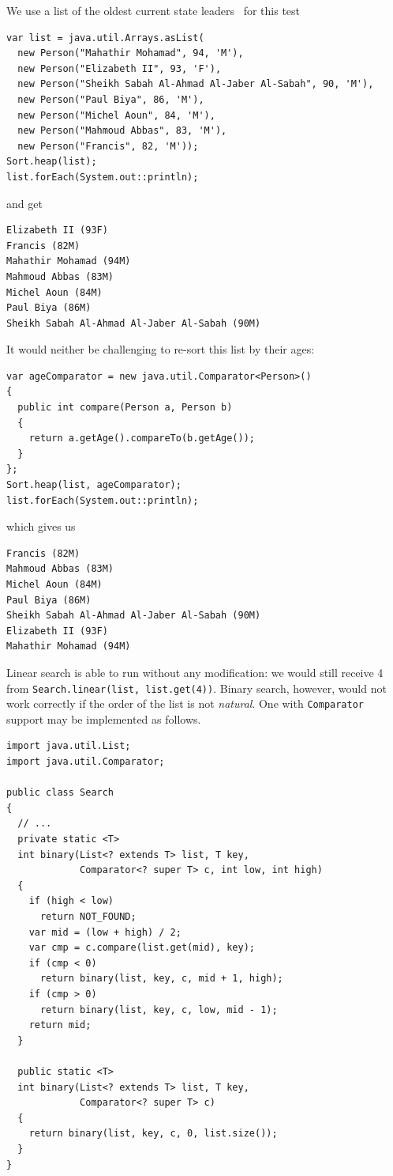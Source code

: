 \documentclass[a4paper,12pt]{article}
\begin{document}
We use a list of the oldest current state leaders~\cite{old} for this test
\begin{verbatim}
var list = java.util.Arrays.asList(
  new Person("Mahathir Mohamad", 94, 'M'),
  new Person("Elizabeth II", 93, 'F'),
  new Person("Sheikh Sabah Al-Ahmad Al-Jaber Al-Sabah", 90, 'M'),
  new Person("Paul Biya", 86, 'M'),
  new Person("Michel Aoun", 84, 'M'),
  new Person("Mahmoud Abbas", 83, 'M'),
  new Person("Francis", 82, 'M'));
Sort.heap(list);
list.forEach(System.out::println);
\end{verbatim}
and get
\begin{verbatim}
Elizabeth II (93F)
Francis (82M)
Mahathir Mohamad (94M)
Mahmoud Abbas (83M)
Michel Aoun (84M)
Paul Biya (86M)
Sheikh Sabah Al-Ahmad Al-Jaber Al-Sabah (90M)
\end{verbatim}

It would neither be challenging to re-sort this list by their ages:
\begin{verbatim}
var ageComparator = new java.util.Comparator<Person>()
{
  public int compare(Person a, Person b)
  {
    return a.getAge().compareTo(b.getAge());
  }
};
Sort.heap(list, ageComparator);
list.forEach(System.out::println);
\end{verbatim}
which gives us
\begin{verbatim}
Francis (82M)
Mahmoud Abbas (83M)
Michel Aoun (84M)
Paul Biya (86M)
Sheikh Sabah Al-Ahmad Al-Jaber Al-Sabah (90M)
Elizabeth II (93F)
Mahathir Mohamad (94M)
\end{verbatim}

Linear search is able to run without any modification: we would still receive
4 from \verb|Search.linear(list, list.get(4))|.  Binary search, however,
would not work correctly if the order of the list is not \emph{natural}.
One with \verb|Comparator| support may be implemented as follows.
\begin{verbatim}
import java.util.List;
import java.util.Comparator;

public class Search
{
  // ...
  private static <T>
  int binary(List<? extends T> list, T key,
             Comparator<? super T> c, int low, int high)
  {
    if (high < low)
      return NOT_FOUND;
    var mid = (low + high) / 2;
    var cmp = c.compare(list.get(mid), key);
    if (cmp < 0)
      return binary(list, key, c, mid + 1, high);
    if (cmp > 0)
      return binary(list, key, c, low, mid - 1);
    return mid;
  }

  public static <T>
  int binary(List<? extends T> list, T key,
             Comparator<? super T> c)
  {
    return binary(list, key, c, 0, list.size());
  }
}
\end{verbatim}
\end{document}
